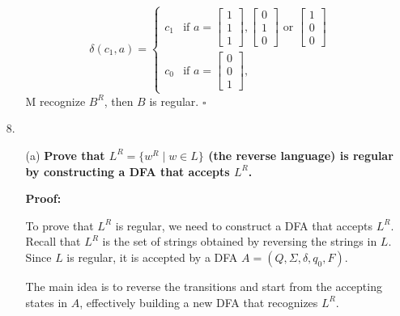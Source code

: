 \documentclass[9pt,tikz,border=2mm]{article}
\begin{document}
\begin{enumerate}
\begin{enumerate}
                \[\delta(c_1,a)=
                    \begin{cases}
                        c_1 & \text{if } a =\begin{bmatrix}
                            1\\
                            1\\
                            1
                        \end{bmatrix},
                        \begin{bmatrix}
                            0\\
                            1\\
                            0
                        \end{bmatrix} \text{ or }
                        \begin{bmatrix}
                            1\\
                            0\\
                            0
                        \end{bmatrix}\\
                        c_0 & \text{if } a =\begin{bmatrix}
                            0\\
                            0\\
                            1
                        \end{bmatrix},
                    \end{cases}
                \]
                M recognize $B^R$, then $B$ is regular.  $\square$
        
            \end{enumerate}
        \item[8.]
        
        \begin{enumerate}
    \item[(a)] \textbf{Prove that \( L^R = \{ w^R \mid w \in L \} \) (the reverse language) is regular by constructing a DFA that accepts \( L^R \).}

    \textbf{Proof:}

    To prove that \( L^R \) is regular, we need to construct a DFA that accepts \( L^R \). Recall that \( L^R \) is the set of strings obtained by reversing the strings in \( L \). Since \( L \) is regular, it is accepted by a DFA \( A = (Q, \Sigma, \delta, q_0, F) \).

    The main idea is to reverse the transitions and start from the accepting states in \( A \), effectively building a new DFA that recognizes \( L^R \).


\end{enumerate}
\end{enumerate}
\end{document}
